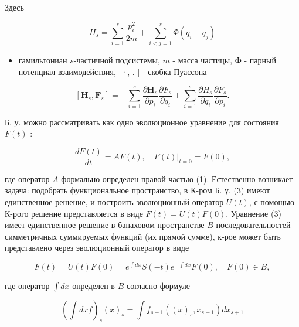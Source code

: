 \documentclass[10pt]{article}
\begin{document}
Здесь



\[

H_{s}=\sum_{i=1}^{s} \frac{p_{i}^{2}}{2 m}+\sum_{i<j=1}^{s} \Phi\left(q_{i}-q_{j}\right)

\]



\begin{itemize}

  \item гамильтониан $s$-частичной подсистемы, $m$ - масса частицы, Ф - парный потенциал взаимодействия, [·, . $]$ - скобка Пуассона

\end{itemize}



\[

\left[\boldsymbol{H}_{s}, \boldsymbol{F}_{s}\right]=-\sum_{i=1}^{s} \frac{\partial \boldsymbol{H}_{s}}{\partial p_{i}} \frac{\partial F_{s}}{\partial q_{i}}+\sum_{i=1}^{s} \frac{\partial H_{s}}{\partial q_{i}} \frac{\partial F_{s}}{\partial p_{i}} .

\]



Б. у. можно рассматривать как одно эволюционное уравнение для состояния $F(t)$ :



\[

\frac{d F(t)}{d t}=A F(t),\left.\quad F(t)\right|_{t=0}=F(0),

\]



где оператор $A$ формально определен правой частью (1). Естественно возникает задача: подобрать функциональное пространство, в К-ром Б. у. (3) имеют единственное решение, и построить эволюционный оператор $U(t)$, с помощью К-рого решение представляется в виде $F(t)=U(t) F(0)$. Уравнение (3) имеет единственное решение в банаховом пространстве $B$ последовательностей симметричных суммируемых функций (их прямой сумме), к-рое может быть представлено через эволюционный оператор в виде



\[

F(t)=U(t) F(0)=e^{\int d x} S(-t) e^{-\int d x} F(0), \quad F(0) \in B,

\]



где оператор $\int d x$ определен в $B$ согласно формуле



\[

\left(\int d x f\right)_{s}(x)_{s}=\int f_{s+1}\left((x)_{s}, x_{s+1}\right) d x_{s+1}

\]
\end{document}
